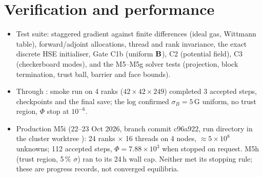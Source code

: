 \section{Verification and performance}
\begin{itemize}
\item Test suite: staggered gradient against finite differences (ideal gas, Wittmann table), forward/adjoint allocations,
thread and rank invariance, the exact discrete HSE initialiser, Gate C1b (uniform $\mathbf B$), C2 (potential field), C3
(checkerboard modes), and the M5--M5g solver tests (projection, block termination, trust ball, barrier and face
bounds).
\item Through : smoke run on 4 ranks ($42\times42\times249$) completed 3 accepted steps, checkpoints and the final
save; the log confirmed $\sigma_B=5$\,G uniform, no trust region, $\Phi$ stop at $10^{-6}$.
\item Production M5i (22--23 Oct 2026, branch  commit c96a922, run directory
 in the cluster worktree ): 24 ranks $\times$ 16 threads on 4 nodes,
$\approx5\times10^8$ unknowns; 112 accepted steps, $\Phi=7.88\times10^3$ when stopped on request. M5h (trust region,
5\,\% $\sigma$) ran to its 24\,h wall cap. Neither met its stopping rule; these are progress records, not converged
equilibria.
\end{itemize}

